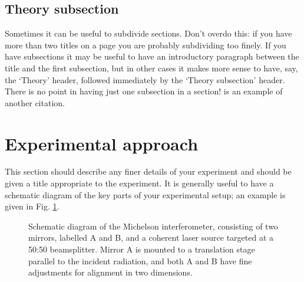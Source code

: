 \documentclass[11pt]{article} %
\newcommand{\citet}{\cite} %
\begin{document}
\subsection{Theory subsection}
Sometimes it can be useful to subdivide sections. Don’t overdo this: if you have more than two titles on a page you are probably subdividing too finely. If you have subsections it may be useful to have an introductory paragraph between the title and the first subsection, but in other cases it makes more sense to have, say, the ‘Theory’ header, followed immediately by the ‘Theory subsection’ header. There is no point in having just one subsection in a section! \citet{Einstein1905} is an example of another citation.


\section{Experimental approach}
This section should describe any finer details of your experiment and should be given a title appropriate to the experiment. It is generally useful to have a schematic diagram of the key parts of your experimental setup; an example is given in Fig. \ref{Michelson}.\\

\begin{figure} %
\centering %
\caption{Schematic diagram of the Michelson interferometer, consisting of two mirrors, labelled A and B, and a coherent laser source targeted at a 50:50 beamsplitter. Mirror A is mounted to a translation stage parallel to the incident radiation, and both A and B have fine adjustments for alignment in two dimensions.} %
\label{Michelson} %
\end{figure}
\end{document}
